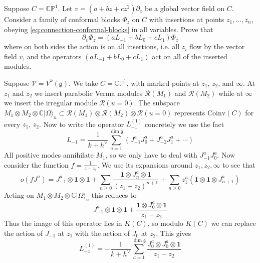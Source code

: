 \documentclass[12pt,letterpaper,reqno]{amsart}
\numberwithin{equation}{section}
\newcommand{\fg}{{\mathfrak g}}
\newcommand{\bbC}{\ensuremath{\mathbb C}}
\newcommand{\bbP}{\ensuremath{\mathbb P}}
\newcommand\bid{{\mathbf 1}}
\newcommand\vac{{|\Omega\rangle}}
\newcommand{\vertex}{\mathcal{V}}
\newcommand{\vrep}{\mathcal{R}}
\newcommand{\Coinv}{{\mathrm{Coinv}}}
\begin{document}
\begin{exercise}\label{ex:global-vf-connection}
Suppose $C = \bbC \bbP^1$. Let $v = (a + b z + c z^2) \partial_z$ 
be a global vector field on $C$.
Consider a family of conformal blocks $\Phi_z$ 
on $C$ with insertions at points
$z_1, \dots, z_n$, obeying \eqref{eq:connection-conformal-blocks}
in all variables.
Prove that
\begin{equation}
  \partial_v \Phi_z = (a L_{-1} + b L_0 + c L_1) \Phi_z
\end{equation}
where on both sides the action is on all insertions, i.e. 
all $z_i$ flow by the vector field $v$, and the operators
$(a L_{-1} + b L_0 + c L_1)$ act on all of the inserted modules.
\end{exercise}

\begin{example} \label{ex:kz-2-reg-1-irreg}
Suppose $\vertex = V^k(\fg)$.
We take $C = \bbC \bbP^1$, with marked points at $z_1$, $z_2$, and $\infty$.
At $z_1$ and $z_2$ we insert parabolic Verma modules $\vrep(M_1)$ and $\vrep(M_2)$
while at $\infty$ we insert the irregular module $\vrep(u=0)$.
The subspace $M_1 \otimes M_2 \otimes \bbC \vac_u \subset \vrep(M_1) \otimes \vrep(M_2) \otimes \vrep(u=0)$ 
represents $\Coinv(C)$ for every $z_1$, $z_2$.
Now to write the operator $L^{(1)}_{-1}$ concretely we use
the fact
\begin{equation}
  L_{-1} = \frac{1}{k + h^\vee} \sum_{a=1}^{\dim \fg} (J^a_{-1} J^a_0 + J^a_{-2} J^a_1 + \cdots)
\end{equation}
All positive modes annihilate $M_1$, so we only have to deal with $J^a_{-1} J^a_0$.
Now consider the function $f = \frac{1}{z-z_1}$. 
We use its expansions around $z_1, z_2, \infty$ to see that
\begin{equation}
 o(f J^a) = J^a_{-1} \otimes \bid \otimes \bid + \sum_{n \ge 0} \frac{\bid \otimes J^a_{n} \otimes \bid}{(z_1 - z_2)^{n+1}} + \sum_{n \ge 0} z_1^n (\bid \otimes \bid \otimes J^a_{n+1})
\end{equation}
Acting on $M_1 \otimes M_2 \otimes \bbC \vac_u$
this reduces to
\begin{equation}
  J^a_{-1} \otimes \bid \otimes \bid + \frac{\bid \otimes J^a_{0} \otimes \bid}{z_1 - z_2}
\end{equation}
Thus the image of this operator lies in $K(C)$,
so modulo $K(C)$
we can replace the action of $J_{-1}$ at $z_1$
with the action of $J_0$ at $z_2$. This gives
\begin{equation}
  L^{(1)}_{-1} = - \frac{1}{k + h^\vee} \sum_{a=1}^{\dim \fg} \frac{J^a_0 \otimes J^a_0 \otimes \bid}{z_1 - z_2}

\end{equation}
\end{example}
\end{document}
